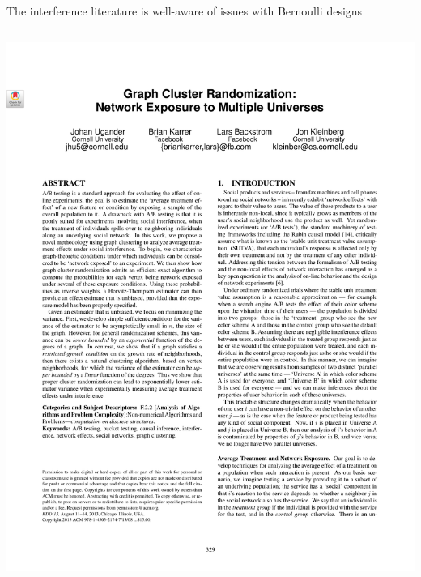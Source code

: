 \documentclass[aspectratio=169]{beamer}
\theoremstyle{remark}
\begin{document}
\begin{frame}{The interference literature is well-aware of issues with Bernoulli designs}
\begin{columns}
\begin{column}{0.5\textwidth}
            \includegraphics[width=\textwidth, page=1, trim={1.5cm 9cm 0 2.5cm}, clip]{./papers/gcr.pdf}
        \end{column}
    \end{columns}
\end{frame}
\end{document}
